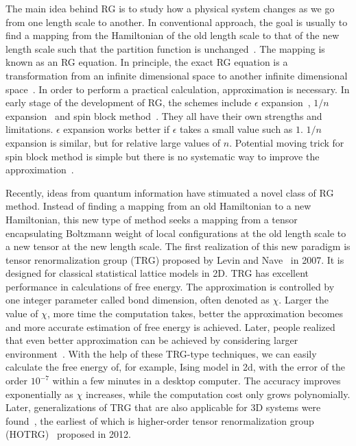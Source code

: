 \documentclass[aps,prb,reprint,superscriptaddress]{revtex4-2}
\begin{document}
The main idea behind RG is to study how a physical system changes as we
go from one length scale to another. In conventional approach, the
goal is usually to find a mapping from the Hamiltonian of the
old length scale to that of the new length scale such that the partition
function is unchanged~\cite{nonlinearRG}. The mapping is known as an RG
equation. In principle, the exact RG equation is a transformation from
an infinite dimensional space to another infinite dimensional
space~\cite{wilsonNobel,wilson1970a}. In order to perform a practical
calculation, approximation is necessary. In early stage of the
development of RG, the schemes include $\epsilon$
expansion~\cite{wilson1972}, $1/n$ expansion~\cite{largeNexp} and spin
block
method~\cite{kadanoff1966,kadanoff1975,migdal,kadanoff1976,niemeijer1973}.
They all have their own strengths and limitations. $\epsilon$ expansion
works better if $\epsilon$ takes a small value such as $1$. $1/n$
expansion is similar, but for relative large values of $n$. Potential
moving trick for spin block method is simple but there is no systematic
way to improve the approximation~\cite{kardar2007}.
%

Recently, ideas from quantum information have stimuated a novel class of
RG method. Instead of finding a mapping from an old Hamiltonian to a new
Hamiltonian, this new type of method seeks a mapping from a tensor
encapsulating Boltzmann weight of local configurations at the old length
scale to a new tensor at the new length scale. The first realization of
this new paradigm is tensor renormalization group (TRG) proposed by
Levin and Nave~\cite{trg} in 2007. It is designed for classical
statistical lattice models in 2D.
TRG has excellent performance in calculations of free energy. The
approximation is controlled by one integer parameter called bond
dimension, often denoted as $\chi$. Larger the value of $\chi$, more
time the computation takes, better the approximation becomes and more
accurate estimation of free energy is achieved. Later, people realized
that even better approximation can be achieved by considering larger
environment~\cite{SRGa,SRGb,hotrg,morita2020global}. With the help of
these TRG-type techniques, we can easily calculate the free energy of,
for example, Ising model in 2d, with the error of the order $10^{-7}$
within a few minutes in a desktop computer. The accuracy improves
exponentially as $\chi$ increases, while the computation cost only grows
polynomially. Later, generalizations of TRG that are also applicable for
3D systems were found~\cite{hotrg,atrg,triadtrg}, the earliest of which
is higher-order tensor renormalization group (HOTRG)~\cite{hotrg}
proposed in 2012.
%
\end{document}
